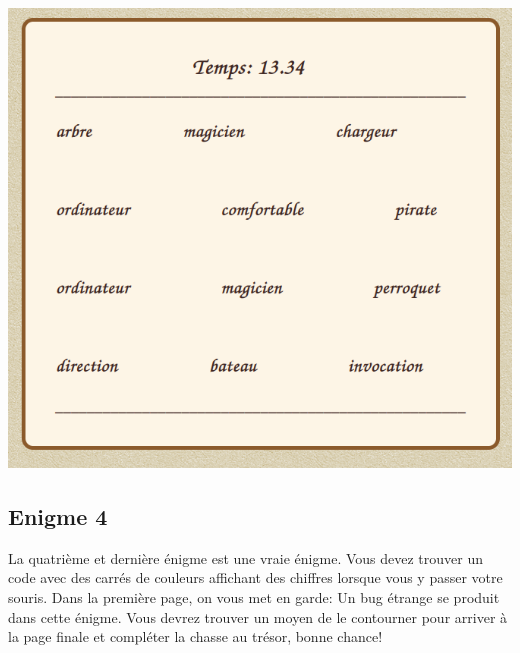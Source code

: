 \documentclass[12pt,a4paper]{article}
\begin{document}
\includegraphics[scale=0.45]{enigme3.png}

\newpage
\subsection{Enigme 4}
La quatrième et dernière énigme est une vraie énigme. Vous devez trouver un code avec des carrés de couleurs affichant des chiffres lorsque vous y passer votre souris. Dans la première page, on vous met en garde: Un bug étrange se produit dans cette énigme. Vous devrez trouver un moyen de le contourner pour arriver à la page finale et compléter la chasse au trésor, bonne chance! \\
\end{document}
